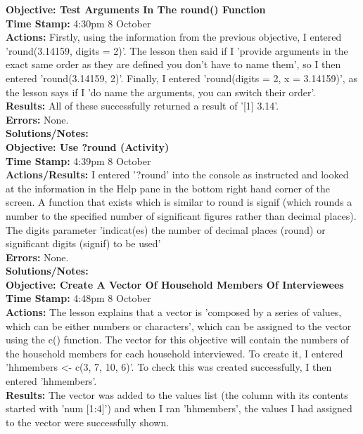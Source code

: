 \documentclass{article}
\begin{document}
\begin{FlushLeft}
\textbf{Objective: Test Arguments In The round() Function}\\ 
\textbf{Time Stamp:} 4:30pm 8 October\\
\textbf{Actions:} Firstly, using the information from the previous objective, I entered 'round(3.14159, digits = 2)'. The lesson then said if I 'provide arguments in the exact same order as they are defined you don't have to name them', so I then entered 'round(3.14159, 2)'. Finally, I entered 'round(digits = 2, x = 3.14159)', as the lesson says if I 'do name the arguments, you can switch their order'.\\
\textbf{Results:} All of these successfully returned a result of '[1] 3.14'.\\
\textbf{Errors:} None.\\
\textbf{Solutions/Notes:}\\
\vspace{5mm}
\textbf{Objective: Use ?round (Activity)}\\ 
\textbf{Time Stamp:} 4:39pm 8 October\\
\textbf{Actions/Results:} I entered '?round' into the console as instructed and looked at the information in the Help pane in the bottom right hand corner of the screen. A function that exists which is similar to round is signif (which rounds a number to the specified number of significant figures rather than decimal places). The digits parameter 'indicat(es) the number of decimal places (round) or significant digits (signif) to be used'\\
\textbf{Errors:} None.\\
\textbf{Solutions/Notes:}\\
\vspace{5mm}
\textbf{Objective: Create A Vector Of Household Members Of Interviewees }\\ 
\textbf{Time Stamp:} 4:48pm 8 October\\
\textbf{Actions:} The lesson explains that a vector is 'composed by a series of values, which can be either numbers or characters', which can be assigned to the vector using the c() function. The vector for this objective will contain the numbers of the household members for each household interviewed. To create it, I entered 'hh\textunderscore members \textless - c(3, 7, 10, 6)'. To check this was created successfully, I then entered 'hh\textunderscore members'. \\
\textbf{Results:} The vector was added to the values list (the column with its contents started with 'num [1:4]') and when I ran 'hh\textunderscore members', the values I had assigned to the vector were successfully shown.\\

\end{FlushLeft}
\end{document}

